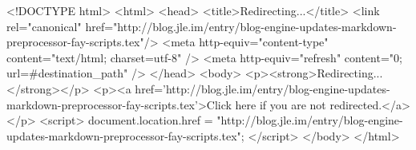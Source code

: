 <!DOCTYPE html>
<html>
<head>
<title>Redirecting...</title>
<link rel="canonical" href="http://blog.jle.im/entry/blog-engine-updates-markdown-preprocessor-fay-scripts.tex"/>
<meta http-equiv="content-type" content="text/html; charset=utf-8" />
<meta http-equiv="refresh" content="0; url=#{destination_path}" />
</head>
<body>
  <p><strong>Redirecting...</strong></p>
  <p><a href='http://blog.jle.im/entry/blog-engine-updates-markdown-preprocessor-fay-scripts.tex'>Click here if you are not redirected.</a></p>
  <script>
    document.location.href = "http://blog.jle.im/entry/blog-engine-updates-markdown-preprocessor-fay-scripts.tex";
  </script>
</body>
</html>
